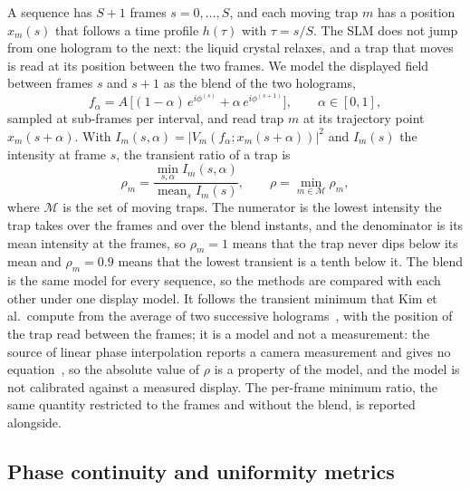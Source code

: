 A sequence has $S+1$ frames $s=0,\dots,S$, and each moving trap $m$ has a position $x_m(s)$ that follows a time profile $h(\tau)$ with $\tau=s/S$. The SLM does not jump from one hologram to the next: the liquid crystal relaxes, and a trap that moves is read at its position between the two frames. We model the displayed field between frames $s$ and $s+1$ as the blend of the two holograms,
\begin{equation}
f_\alpha=A\,\big[(1-\alpha)\,e^{i\phi^{(s)}}+\alpha\,e^{i\phi^{(s+1)}}\big],\qquad\alpha\in[0,1],\label{eq:blend}
\end{equation}
sampled at \parSubsteps{} sub-frames per interval, and read trap $m$ at its trajectory point $x_m(s+\alpha)$. With $I_m(s,\alpha)=|V_m(f_\alpha;x_m(s+\alpha))|^2$ and $I_m(s)$ the intensity at frame $s$, the transient ratio of a trap is
\begin{equation}
\rho_m=\frac{\min_{s,\alpha}I_m(s,\alpha)}{\operatorname{mean}_sI_m(s)},\qquad \rho=\min_{m\in\mathcal M}\rho_m,\label{eq:transient}
\end{equation}
where $\mathcal M$ is the set of moving traps. The numerator is the lowest intensity the trap takes over the frames and over the blend instants, and the denominator is its mean intensity at the frames, so $\rho_m=1$ means that the trap never dips below its mean and $\rho_m=0.9$ means that the lowest transient is a tenth below it. The blend is the same model for every sequence, so the methods are compared with each other under one display model. It follows the transient minimum that Kim et al.\ compute from the average of two successive holograms~\cite{kimoe}, with the position of the trap read between the frames; it is a model and not a measurement: the source of linear phase interpolation reports a camera measurement and gives no equation~\cite{lpi}, so the absolute value of $\rho$ is a property of the model, and the model is not calibrated against a measured display. The per-frame minimum ratio, the same quantity restricted to the frames and without the blend, is reported alongside.

\subsection{Phase continuity and uniformity metrics}

